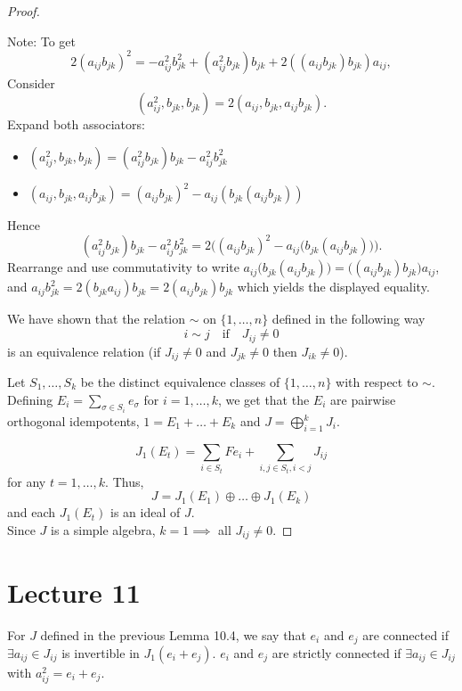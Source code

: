 \documentclass{article}
\begin{document}
\begin{proof}
\begin{tcolorbox}[colback=gray!20, colframe=black] 
Note: To get  
\[ 2(a_{ij}b_{jk})^2 = -a_{ij}^2 b_{jk}^2 + (a_{ij}^2 b_{jk})b_{jk} + 2((a_{ij}b_{jk})b_{jk})a_{ij}, \]  
Consider 
\[ (a_{ij}^2, b_{jk}, b_{jk}) = 2(a_{ij}, b_{jk}, a_{ij}b_{jk}). \]  
Expand both associators:  
\begin{itemize}  
    \item $(a_{ij}^2, b_{jk}, b_{jk}) = (a_{ij}^2 b_{jk})b_{jk} - a_{ij}^2 b_{jk}^2$  
    \item $(a_{ij}, b_{jk}, a_{ij}b_{jk}) = (a_{ij}b_{jk})^2 - a_{ij}(b_{jk}(a_{ij}b_{jk}))$  
\end{itemize}  
Hence  
\[ (a_{ij}^2 b_{jk})b_{jk} - a_{ij}^2 b_{jk}^2 = 2\Big((a_{ij}b_{jk})^2 - a_{ij}\big(b_{jk}(a_{ij}b_{jk})\big)\Big). \]  
Rearrange and use commutativity to write $a_{ij}\big(b_{jk}(a_{ij}b_{jk})\big) = \big((a_{ij}b_{jk})b_{jk}\big)a_{ij}$, and $ a_{ij} b_{jk}^2=2(b_{jk}a_{ij} )b_{jk}=2(a_{ij}b_{jk} )b_{jk}$ which yields the displayed equality.  
\end{tcolorbox}

We have shown that the relation $\sim$ on $\{1, \dots, n\}$ defined in the following way  
\[ i \sim j \quad \text{if} \quad J_{ij} \ne 0 \]  
is an equivalence relation (if $ J_{ij}\neq 0 $ and $ J_{jk} \neq 0 $ then $ J_{ik} \neq 0 $).  

Let $S_1, \dots, S_k$ be the distinct equivalence classes of $\{1, \dots, n\}$ with respect to $\sim$.  
Defining $E_i = \sum_{\sigma \in S_i} e_\sigma$ for $i=1, \dots, k$, we get that the $E_i$ are pairwise orthogonal idempotents, $1 = E_1 + \dots + E_k$ and $J = \bigoplus_{i=1}^k J_i$.  

\[ J_1(E_t) = \sum_{i \in S_t} Fe_i + \sum_{i,j \in S_t, i<j} J_{ij} \]  
for any $t=1, \dots, k$. Thus,  
\[ J = J_1(E_1) \oplus \dots \oplus J_1(E_k) \]  
and each $J_1(E_t)$ is an ideal of $J$. \\
Since $J$ is a simple algebra, $k=1 \implies$ all $J_{ij} \ne 0$. 
\end{proof} 

\section{Lecture 11}

\begin{definition}  
For $J$ defined in the previous Lemma 10.4, we say that $e_i$ and $e_j$ are connected if $\exists a_{ij} \in J_{ij}$ is invertible in $ J_1(e_i+e_j) $. $e_i$ and $e_j$ are strictly connected if $\exists a_{ij} \in J_{ij}$ with $a_{ij}^2 = e_i+e_j$.  
\end{definition} 
\end{document}
